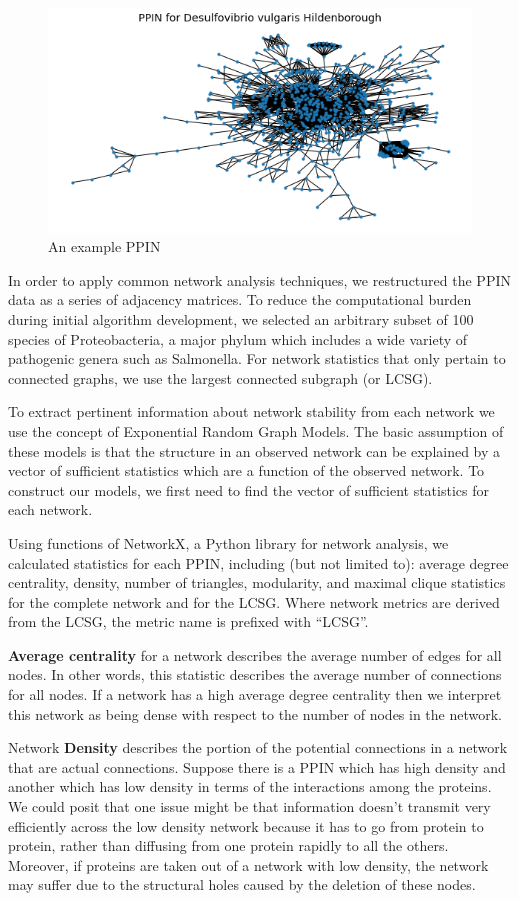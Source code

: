 \documentclass[12pt]{article}
\begin{document}
\begin{figure}
\centering
  \includegraphics[width=.5\linewidth]{PPIN_fig1}
  \caption{An example PPIN}
  \label{fig:PPIN_fig1}
\end{figure}

In order to apply common network analysis techniques, we restructured the PPIN data as a series of adjacency matrices. To reduce the computational burden during initial algorithm development, we selected an arbitrary subset of 100 species of Proteobacteria, a major phylum which includes a wide variety of pathogenic genera such as Salmonella. For network statistics that only pertain to connected graphs, we use the largest connected subgraph (or LCSG).

To extract pertinent information about network stability from each network we use the concept of Exponential Random Graph Models. The basic assumption of these models is that the structure in an observed network can be explained by a vector of sufficient statistics which are a function of the observed network. To construct our models, we first need to find the vector of sufficient statistics for each network.

Using functions of NetworkX, a Python library for network analysis, we calculated statistics for each PPIN, including (but not limited to): average degree centrality, density, number of triangles, modularity, and maximal clique statistics for the complete network and for the LCSG. Where network metrics are derived from the LCSG, the metric name is prefixed with ``LCSG''.

\textbf{Average centrality} for a network describes the average number of edges for all nodes. In other words, this statistic describes the average number of connections for all nodes. If a network has a high average degree centrality then we interpret this network as being dense with respect to the number of nodes in the network.

Network \textbf{Density} describes the portion of the potential connections in a network that are actual connections. Suppose there is a PPIN which has high density and another which has low density in terms of the interactions among the proteins. We could posit that one issue might be that information doesn't transmit very efficiently across the low density network because it has to go from protein to protein, rather than diffusing from one protein rapidly to all the others. Moreover, if proteins are taken out of a network with low density, the network may suffer due to the structural holes caused by the deletion of these nodes.
\end{document}
